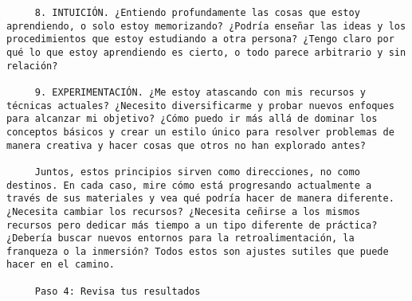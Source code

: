 \begin{verbatim}
	 8. INTUICIÓN. ¿Entiendo profundamente las cosas que estoy aprendiendo, o solo estoy memorizando? ¿Podría enseñar las ideas y los procedimientos que estoy estudiando a otra persona? ¿Tengo claro por qué lo que estoy aprendiendo es cierto, o todo parece arbitrario y sin relación?
	 
	 9. EXPERIMENTACIÓN. ¿Me estoy atascando con mis recursos y técnicas actuales? ¿Necesito diversificarme y probar nuevos enfoques para alcanzar mi objetivo? ¿Cómo puedo ir más allá de dominar los conceptos básicos y crear un estilo único para resolver problemas de manera creativa y hacer cosas que otros no han explorado antes? 
	 
	 Juntos, estos principios sirven como direcciones, no como destinos. En cada caso, mire cómo está progresando actualmente a través de sus materiales y vea qué podría hacer de manera diferente. ¿Necesita cambiar los recursos? ¿Necesita ceñirse a los mismos recursos pero dedicar más tiempo a un tipo diferente de práctica? ¿Debería buscar nuevos entornos para la retroalimentación, la franqueza o la inmersión? Todos estos son ajustes sutiles que puede hacer en el camino.
	 
	 Paso 4: Revisa tus resultados
	 

\end{verbatim}
